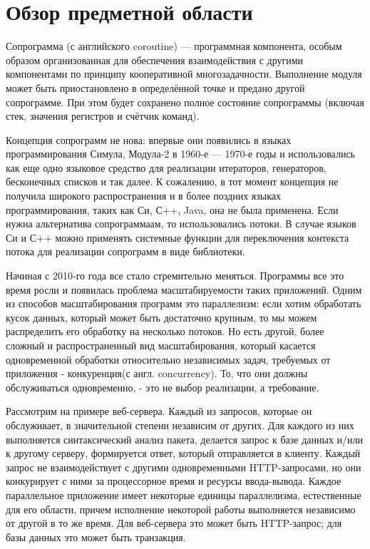 \section{Обзор предметной области}

	Сопрограмма (с английского coroutine) — программная компонента, особым образом организованная для обеспечения взаимодействия с другими компонентами по принципу кооперативной многозадачности. Выполнение модуля может быть приостановлено в определённой точке и предано другой сопрограмме. При этом будет сохранено полное состояние сопрограммы (включая стек, значения регистров и счётчик команд).
	\par
	Концепция сопрограмм не нова: впервые они появились в языках программирования Симула\cite{simula},
	Модула-2\cite{modula} в 1960-е — 1970-е годы и использовались как еще одно языковое средство для
	реализации итераторов, генераторов, бесконечных списков и так далее. К сожалению, в
	тот момент концепция не получила широкого распространения и в более поздних языках
	программирования, таких как Си, С++, Java, она не была применена. Если нужна
	альтернатива сопрограммаам, то использовались потоки. В случае языков Си и С++ можно применять 
	системные функции для переключения контекста потока для реализации сопрограмм в виде библиотеки.
	\par
	Начиная с 2010-го года все стало стремительно меняться. Программы все это время
	росли и появилась проблема масштабируемости таких приложений. Одним из способов
	масштабирования программ это параллелизм: если хотим обработать кусок данных, который
	может быть достаточно крупным, то мы можем распределить его обработку на несколько потоков. Но есть
	другой, более сложный и распространенный вид масштабирования, который касается одновременной
	обработки относительно независимых задач, требуемых от приложения - конкуренция(с англ.
	concurrency). То, что они должны обслуживаться одновременно, - это не выбор реализации, а требование.
	
	\par
	Рассмотрим на примере веб-сервера. Каждый из запросов, которые он обслуживает, в значительной степени
	независим от других. Для каждого из них выполняется синтаксический анализ пакета, делается запрос к базе данных и/или к другому серверу, формируется ответ, который
	отправляется в клиенту. Каждый запрос не взаимодействует с другими одновременными
	HTTP-запросами, но они конкурирует с ними за процессорное время и ресурсы ввода-вывода.
	Каждое параллельное приложение имеет 
	некоторые единицы параллелизма, естественные для его области, причем исполнение 
	некоторой работы выполняется независимо от другой в то же время. Для 
	веб-сервера это может быть HTTP-запрос; для базы данных это может быть транзакция.
	

